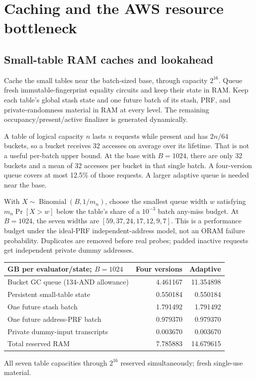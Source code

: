 \documentclass[11pt]{article}
\begin{document}
\section{Caching and the AWS resource bottleneck}
\subsection{Small-table RAM caches and lookahead}
Cache the small tables near the batch-sized base, through capacity $2^{16}$.
Queue fresh immutable-fingerprint equality circuits and keep their state
in RAM. Keep each table's global stash state and one future batch of its
stash, PRF, and private-randomness material in RAM at every level. The
remaining occupancy/present/active finalizer is generated dynamically.

A table of logical capacity $n$ lasts $n$ requests while present and has
$2n/64$ buckets, so a bucket receives 32 accesses on average over its
lifetime. That is not a useful per-batch upper bound. At the base with
$B=1024$, there are only 32 buckets and a mean of 32 accesses per bucket
in that single batch. A four-version queue covers at most 12.5\% of those
requests. A larger adaptive queue is needed near the base.

With $X\sim\operatorname{Binomial}(B,1/m_n)$, choose the smallest queue
width $w$ satisfying $m_n\Pr[X>w]$ below the table's share of a $10^{-3}$
batch any-miss budget. At $B=1024$, the seven widths are
$[59,37,24,17,12,9,7]$. This is a performance budget under the ideal-PRF
independent-address model, not an ORAM failure probability. Duplicates are
removed before real probes; padded inactive requests get independent
private dummy addresses.

\begin{center}\small
\begin{tabular}{lrr}\toprule
GB per evaluator/state; $B=1024$ & Four versions & Adaptive\\\midrule
Bucket GC queue (134-AND allowance) & 4.461167 & 11.354898\\
Persistent small-table state & 0.550184 & 0.550184\\
One future stash batch & 1.791492 & 1.791492\\
One future address-PRF batch & 0.979370 & 0.979370\\
Private dummy-input transcripts & 0.003670 & 0.003670\\
Total reserved RAM & 7.785883 & 14.679615\\
\bottomrule\end{tabular}\end{center}
{\footnotesize All seven table capacities through $2^{16}$ reserved simultaneously; fresh single-use material.\par}
\end{document}
